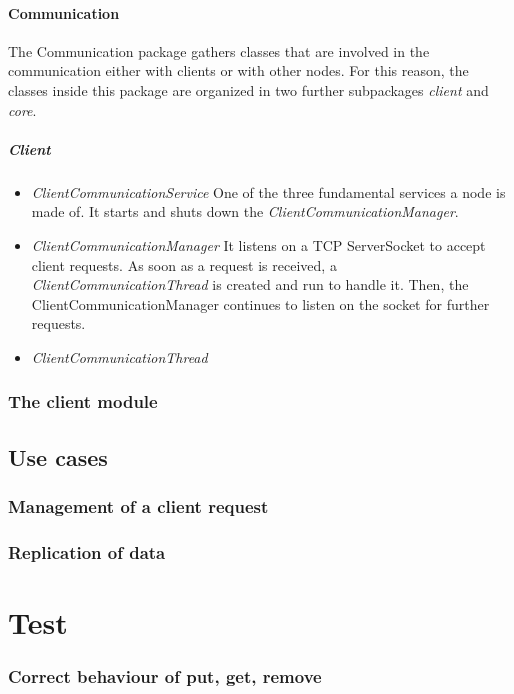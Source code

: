 \documentclass{article}
\begin{document}
\paragraph{Communication} The Communication package gathers classes that are involved in the communication either with clients or with other nodes. For this reason, the classes inside this package are organized in two further subpackages \textit{client} and \textit{core}. 
\subparagraph{Client} 
\begin{itemize}
\item \textit{ClientCommunicationService} One of the three fundamental services a node is made of. It starts and shuts down the \textit{ClientCommunicationManager}.
\item \textit{ClientCommunicationManager} It listens on a TCP ServerSocket to accept client requests. As soon as a request is received, a \textit{ClientCommunicationThread} is created and run to handle it. Then, the ClientCommunicationManager continues to listen on the socket for further requests.
\item \textit{ClientCommunicationThread}
\end{itemize}


\subsubsection{The client module} 

\subsection{Use cases} 

\subsubsection{Management of a client request} 

\subsubsection{Replication of data} 

\section{Test}

\subsubsection{Correct behaviour of put, get, remove} 
\end{document}
